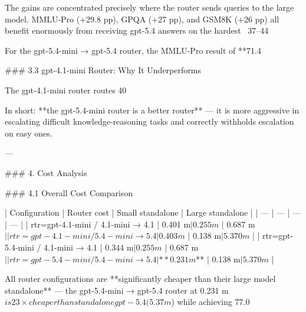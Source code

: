 The gains are concentrated precisely where the router sends queries to the large model. MMLU-Pro (+29.8 pp), GPQA (+27 pp), and GSM8K (+26 pp) all benefit enormously from receiving gpt-5.4 answers on the hardest ~37–44%

For the gpt-5.4-mini → gpt-5.4 router, the MMLU-Pro result of **71.4%

### 3.3 gpt-4.1-mini Router: Why It Underperforms

The gpt-4.1-mini router routes 40%

In short: **the gpt-5.4-mini router is a better router** — it is more aggressive in escalating difficult knowledge-reasoning tasks and correctly withholds escalation on easy ones.

---

### 4. Cost Analysis

### 4.1 Overall Cost Comparison

| Configuration | Router cost | Small standalone | Large standalone |
| --- | --- | --- | --- |
| rtr=gpt-4.1-mini / 4.1-mini → 4.1 | 0.401 m$ | 0.255 m$ | 0.687 m$ |
| rtr=gpt-4.1-mini / 5.4-mini → 5.4 | 0.403 m$ | 0.138 m$ | 5.370 m$ |
| rtr=gpt-5.4-mini / 4.1-mini → 4.1 | 0.344 m$ | 0.255 m$ | 0.687 m$ |
| rtr=gpt-5.4-mini / 5.4-mini → 5.4 | **0.231 m$** | 0.138 m$ | 5.370 m$ |

All router configurations are **significantly cheaper than their large model standalone** — the gpt-5.4-mini → gpt-5.4 router at 0.231 m$ is 23× cheaper than standalone gpt-5.4 (5.37 m$) while achieving 77.0%

